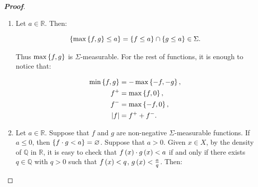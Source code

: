 \begin{proposition}
\begin{proof}[\rm\textbf{Proof}]
\begin{enumerate}
      If $b,c\in\mathbb{R}$, the proof is trivial. If $b=-\infty$, then $c\in\mathbb{R}\cup\set{-\infty}$, $a-c\in\mathbb{R}\cup\set{+\infty}$, $b+c=-\infty<a$ and $b=-\infty<a-c$. If $b=+\infty$, then $c\in\mathbb{R}\cup\set{+\infty}$, $a-c\in\mathbb{R}\cup\set{-\infty}$, $b+c=+\infty\not<a$ and $b=+\infty\not<a-c$. This proves that $b+c<a$ if and only if $b<a-c$.
      
      Given $x\in X$, we have $f\pr{x}+g\pr{x}<a$ if and only if $f\pr{x}<a-g\pr{x}$. As $\mathbb{Q}$ is dense in $\mathbb{R}$, the inequality $f\pr{x}<a-g\pr{x}$ is equivalent to the existence of $q\in\mathbb{Q}$ such that $f\pr{x}<q<a-g\pr{x}$. In other words, $f\pr{x}+g\pr{x}<a$ if and only if there exists $q\in\mathbb{Q}$ such that $f\pr{x}<q$ and $g\pr{x}<a-q$. Since $\mathbb{Q}$ is a countable set, we have:

      \begin{equation}
        \begin{split}
          \set{f+g<a} & =\set{f<a-g}=\bigcup_{q\in\mathbb{Q}}{\set{f<q<a-g}}\\
          & =\bigcup_{q\in\mathbb{Q}}{\pr{\set{f<q}\cap\set{g<a-q}}}\in\Sigma.
        \end{split}
      \end{equation}

      Therefore, $f+g$ is $\Sigma$-measurable.
      \item Let $a\in\mathbb{R}$. Then:
      
      \begin{equation}
        \left\{\max\left\{f,g\right\}\leq a\right\}=\left\{f\leq a\right\}\cap\left\{g\leq a\right\}\in\Sigma.
      \end{equation}

      Thus $\max\left\{f,g\right\}$ is $\Sigma$-measurable. For the rest of functions, it is enough to notice that:

      \begin{equation}
        \begin{split}
          \min\left\{f,g\right\} & =-\max\left\{-f,-g\right\},\\
          f^+ & =\max\left\{f,0\right\},\\
          f^- & =\max\left\{-f,0\right\},\\
          \left|f\right| & =f^++f^-.
        \end{split}
      \end{equation}

      \item Let $a\in\mathbb{R}$. Suppose that $f$ and $g$ are non-negative $\Sigma$-measurable functions. If $a\leq 0$, then $\left\{f\cdot g<a\right\}=\varnothing$. Suppose that $a>0$. Given $x\in X$, by the density of $\mathbb{Q}$ in $\mathbb{R}$, it is easy to check that $f\left(x\right)\cdot g\left(x\right)<a$ if and only if there exists $q\in\mathbb{Q}$ with $q>0$ such that $f\pr{x}<q$, $g\left(x\right)<\frac{a}{q}$. Then:
      

\end{enumerate}
\end{proof}
\end{proposition}
